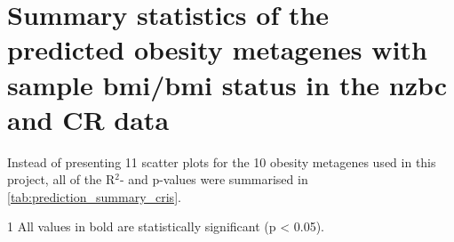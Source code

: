	\newpage

	\section{Summary statistics of the predicted obesity metagenes with sample \gls{bmi}/\gls{bmi} status in the \gls{nzbc} and CR data}
	\label{sec:summary_statistics_of_the_predicted_obesity_metagenes_with_sample_bmi_bmi_status_in_nzbc_and_cr_data}

	Instead of presenting 11 scatter plots for the 10 obesity metagenes used in this project, all of the R$^2$- and p-values were summarised in \cref{tab:prediction_summary_cris}.

	\begin{ThreePartTable}
			\begin{TableNotes}
				\begin{footnotesize}
				\item [1] All values in bold are statistically significant (p \textless{} 0.05).
				\end{footnotesize}
			\end{TableNotes}
		

\end{ThreePartTable}
